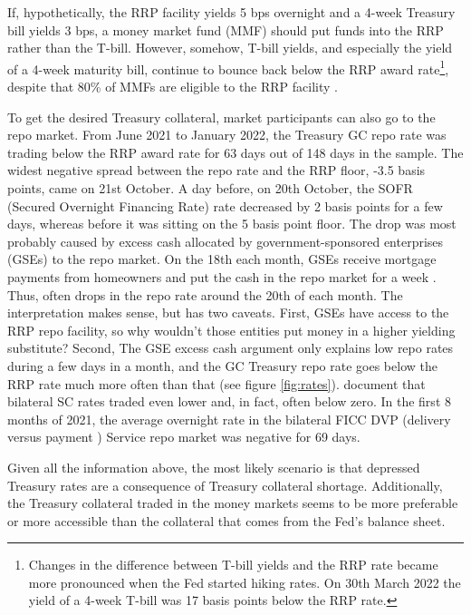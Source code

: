 \documentclass[11pt,a4paper,english,oneside]{article}
\begin{document}
If, hypothetically, the RRP facility yields 5 bps overnight and a 4-week Treasury bill yields 3 bps, a money market fund (MMF) should put funds into the RRP rather than the T-bill. However, somehow, T-bill yields, and especially the yield of a 4-week maturity bill, continue to bounce back below the RRP award rate\footnote{Changes in the difference between T-bill yields and the RRP rate became more pronounced when the Fed started hiking rates. On 30th March 2022 the yield of a 4-week T-bill was 17 basis points below the RRP rate.}, despite that 80\% of MMFs are eligible to the RRP facility \citep{cipriani2022}.

To get the desired Treasury collateral, market participants can also go to the repo market. From June 2021 to January 2022, the Treasury GC repo rate was trading below the RRP award rate for 63 days out of 148 days in the sample. The widest negative spread between the repo rate and the RRP floor, -3.5 basis points, came on 21st October. A day before, on 20th October, the SOFR (Secured Overnight Financing Rate) rate decreased by 2 basis points for a few days, whereas before it was sitting on the 5 basis point floor. The drop was most probably caused by excess cash allocated by government-sponsored enterprises (GSEs) to the repo market. On the 18th each month, GSEs receive mortgage payments from homeowners and put the cash in the repo market for a week \citep{reuters2021}. Thus, often drops in the repo rate around the 20th of each month. The interpretation makes sense, but has two caveats. First, GSEs have access to the RRP repo facility, so why wouldn't those entities put money in a higher yielding substitute? Second, The GSE excess cash argument only explains low repo rates during a few days in a month, and the GC Treasury repo rate goes below the RRP rate much more often than that (see figure \ref{fig:rates}). \citet{ofr2021} document that bilateral SC rates traded even lower and, in fact, often below zero. In the first 8 months of 2021, the average overnight rate in the bilateral FICC DVP (delivery versus payment ) Service repo market was negative for 69 days.

Given all the information above, the most likely scenario is that depressed Treasury rates are a consequence of Treasury collateral shortage. Additionally, the Treasury collateral traded in the money markets seems to be more preferable or more accessible than the collateral that comes from the Fed's balance sheet.
\end{document}
